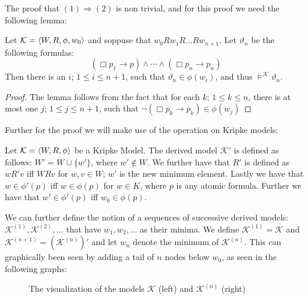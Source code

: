 \documentclass[../main.tex]{subfiles}
\begin{document}
	The proof that $(1)\Rightarrow(2)$ is non trivial, and for this proof
	we need the following lemma:
	\begin{lem}
		\label{lem:hvad}
		Let $\mathcal{K}=\langle W,R,\phi,w_0\rangle$ and soppuse that
		$w_0Rw_1R\ldots Rw_{n+1}$. Let $\vartheta_n$ be the following
		formulas:
		\[(\Box p_1\rightarrow p)\wedge\cdots\wedge(\Box p_n\rightarrow
		p_n)\]
		Then there is an $i$; $1\leq i\leq n+1$, such that
		$\vartheta_n\in\phi(w_i)$, and thus
		$\vDash^\mathcal{K}\vartheta_n$.
	\end{lem}
	\begin{proof}
		The lemma follows from the fact that for each $k$; $1\leq k\leq
		n$, there is at most one $j$; $1\leq j\leq n+1$, such that
		$\neg(\Box p_k\rightarrow p_k)\in\phi(w_j)$
	\end{proof}
Further for the proof we will make use of the operation on Kripke models:
\begin{defi}
	Let $\mathcal{K}=\langle W,R,\phi\rangle$ be a Kripke Model. The derived model
	$\mathcal{K'}$ is defined as follows: $W'=W\cup \{w'\}$, where
	$w'\not\in W$. We further have that $R'$ is defined as $wR'v$ iff $WRv$
	for $w,v\in W$; $w'$ is the new minimum element. Lastly we have that
	$w\in\phi'(p)$ iff $w\in\phi(p)$ for $w\in K$, where $p$ is any atomic
	formula. Further we have that $w'\in\phi'(p)$ iff $w_0\in\phi(p)$.
\end{defi}
We can further define the notion of a sequences of successive derived models:
$\mathcal{K}^{(1)},\mathcal{K}^{(2)},\ldots$ that have $w_1,w_2,\ldots$ as
their minima. We define $\mathcal{K}^{(1)}=\mathcal{K}$ and
$\mathcal{K}^{(n+1)}=(\mathcal{K}^{(n)})'$ and let $w_n$ denote the minimum of
$\mathcal{K}^{(n)}$. This can graphically been seen by adding a tail of $n$
nodes below $w_0$, as seen in the following graphs:

\newpage

\begin{figure}[h]
	\begin{center}
\qquad
\qquad
{}
\end{center}
\caption{The visualization of the models $\mathcal{K}$ (left) and
$\mathcal{K}^{(n)}$ (right)}
\end{figure}
\end{document}
